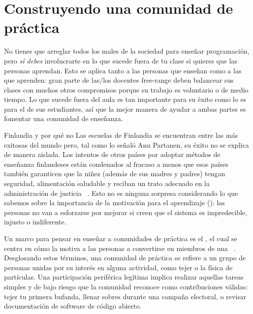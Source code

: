 \chapter{Construyendo una comunidad de práctica}\label{s:community}

No tienes que arreglar todos los males de la sociedad para enseñar programación,
pero \emph{sí debes} involucrarte en
lo que sucede fuera de tu clase si quieres que las personas aprendan.
Esto se aplica tanto a las personas que enseñan como a las que aprenden:
gran parte de las/los docentes free-range deben balancear sus clases con muchos otros compromisos
porque su trabajo es voluntario o de medio tiempo.
Lo que sucede fuera del aula es tan importante para su éxito
como lo es para el de sus estudiantes,
así que la mejor manera de ayudar a ambas partes es fomentar una comunidad de enseñanza.


\begin{aside}{Finlandia y por qué no}
Las escuelas de Finlandia se encuentran entre las más exitosas del mundo
pero, tal como lo señaló Anu Partanen,
su éxito no se explica de manera aislada.
  Los intentos de otros países por adoptar métodos de enseñanza finlandeses están condenados al fracaso
  a menos que esos países también garanticen que la niñez (además de sus madres y padres) tengan seguridad, alimentación saludable y reciban un trato adecuado en la administración de justicia ~\cite{Sahl2015, Wilk2011}.
  Esto no es ninguna sorpresa considerando lo que sabemos sobre la importancia de la motivación para el aprendizaje ():
  las personas no van a esforzarse por mejorar si creen que el sistema es impredecible, injusto o indiferente.
\end{aside}

Un marco para pensar en enseñar a comunidades de práctica es el ,
el cual se centra en cómo la 
motiva a las personas a convertirse en miembros de
una ~\cite{Weng2015}.
Desglosando estos términos,
una comunidad de práctica se refiere a  un grupo de personas unidas por su interés en alguna actividad,
como tejer o la física de partículas.
Una  participación periférica legítima implica realizar aquellas tareas simples y de bajo riesgo
que la comunidad reconoce como contribuciones válidas:
tejer tu primera bufanda,
llenar sobres durante una campaña electoral,
o revisar documentación de software de código abierto.

